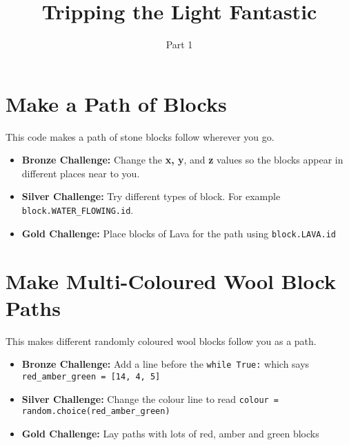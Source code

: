 \documentclass{geocraft-worksheet}
\begin{document}
\title{Tripping the Light Fantastic}
\subtitle{Part 1}

\date{}

\maketitle


\section{Make a Path of Blocks}\vspace{-0.5cm}
\lstset{language=Python}

\noindent%
%
\vspace{0.2cm}
%
%

\noindent This code makes a path of stone blocks follow wherever you go. 

\begin{itemize}
\item\textbf{Bronze Challenge:} Change the \textbf{x, y}, and \textbf
  {z} values so the blocks appear in different places near to you.   

\item\textbf{Silver Challenge:} Try different types of block. For example
  \lstinline{block.WATER_FLOWING.id}.  

\item\textbf{Gold Challenge:} Place blocks of Lava for the path using \lstinline{block.LAVA.id}

\end{itemize}

\section{Make Multi-Coloured Wool Block Paths}\vspace{-0.5cm}

\noindent%
%
\vspace{0.2cm}
%
%

\noindent This makes different randomly coloured wool blocks follow you as a path.

\begin{itemize}
\item\textbf{Bronze Challenge:} Add a line before the \lstinline{while True:} which says \lstinline{red_amber_green = [14, 4, 5]}

\item\textbf{Silver Challenge:} Change the colour line to read \lstinline{colour = random.choice(red_amber_green)}

\item\textbf{Gold Challenge:} Lay paths with lots of red, amber and green blocks

\end{itemize}
\end{document}
